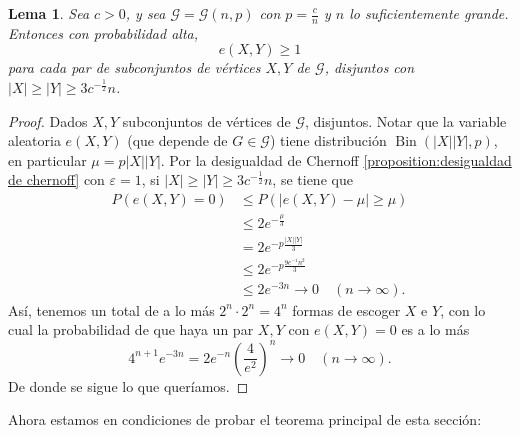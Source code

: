 \documentclass[12pt]{report}
\theoremstyle{plain}
\newtheorem{lemma}[theorem]{Lema}
\theoremstyle{definition}
\newcommand{\abs}[1]{\left \vert #1 \right \vert}
\begin{document}
\begin{lemma}
Sea $c > 0$, y sea $\mathcal G = \mathcal G (n,p)$ con $p = \frac c n$ y $n$ lo suficientemente grande. Entonces con probabilidad alta,
\[
    e(X,Y) \geq 1
\]
para cada par de subconjuntos de vértices $X,Y$ de $\mathcal G$, disjuntos con $\abs X \geq \abs Y \geq 3 c^{-\frac 1 2} n$.
\end{lemma}
\begin{proof}
Dados $X,Y$ subconjuntos de vértices de $\mathcal G$, disjuntos. Notar que la variable aleatoria $e(X,Y)$ (que depende de $G \in \mathcal G$) tiene distribución $\operatorname{Bin}(\abs X \abs Y, p)$, en particular $\mu = p \abs X \abs Y$. Por la desigualdad de Chernoff \ref{proposition:desigualdad de chernoff} con $\varepsilon = 1$, si $\abs X \geq \abs Y \geq 3 c^{-\frac 1 2}n$, se tiene que
\begin{align*}
P(e(X,Y) = 0) &\leq P(\abs{e(X,Y) -  \mu} \geq \mu) \\
&\leq 2 e^{- \frac \mu 3} \\
&= 2 e^{-p \frac{\abs X \abs Y}{3}} \\
&\leq 2 e^{-p \frac{9 c^{-1} n^2}{3}} \\
&\leq 2 e^{- 3 n}  \longrightarrow 0 \quad (n \to \infty).
\end{align*}
Así, tenemos un total de a lo más $2^n \cdot 2^n = 4^n$ formas de escoger $X$ e $Y$, con lo cual la probabilidad de que haya un par $X,Y$ con $e(X,Y) = 0$ es a lo más
\[
    4^{n+1} e^{-3n} = 2e^{-n} \left (\frac 4 {e^2} \right)^n \longrightarrow 0 \quad (n \to \infty).
\]
De donde se sigue lo que queríamos.
\end{proof}


Ahora estamos en condiciones de probar el teorema principal de esta sección:
\end{document}
